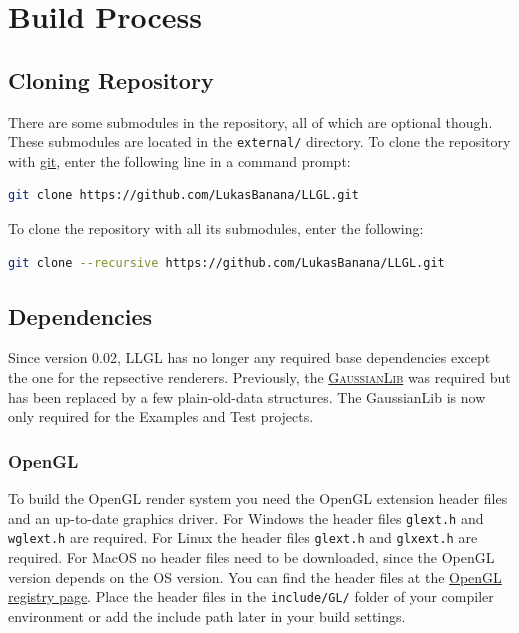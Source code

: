 \documentclass{article}
\begin{document}

\newpage
\section{Build Process}

\subsection{Cloning Repository}

There are some submodules in the \LLGL repository, all of which are optional though.
These submodules are located in the \texttt{external/} directory.
To clone the repository with \href{https://git-scm.com/}{git}, enter the following line in a command prompt:
\begin{lstlisting}[language=sh]
git clone https://github.com/LukasBanana/LLGL.git
\end{lstlisting}
To clone the repository with all its submodules, enter the following:
\begin{lstlisting}[language=sh]
git clone --recursive https://github.com/LukasBanana/LLGL.git
\end{lstlisting}

\subsection{Dependencies}

Since version 0.02, LLGL has no longer any required base dependencies except the one for the repsective renderers.
Previously, the \href{https://github.com/LukasBanana/GaussianLib}{\textsc{GaussianLib}} was required but has been replaced by a few plain-old-data structures.
The GaussianLib is now only required for the Examples and Test projects.

\subsubsection{OpenGL}

To build the OpenGL render system you need the OpenGL extension header files and an up-to-date graphics driver.
For Windows the header files \texttt{glext.h} and \texttt{wglext.h} are required.
For Linux the header files \texttt{glext.h} and \texttt{glxext.h} are required.
For MacOS no header files need to be downloaded, since the OpenGL version depends on the OS version.
You can find the header files at the \href{https://www.opengl.org/registry/#headers}{OpenGL registry page}.
Place the header files in the \texttt{include/GL/} folder of your compiler environment
or add the include path later in your build settings.
\end{document}
